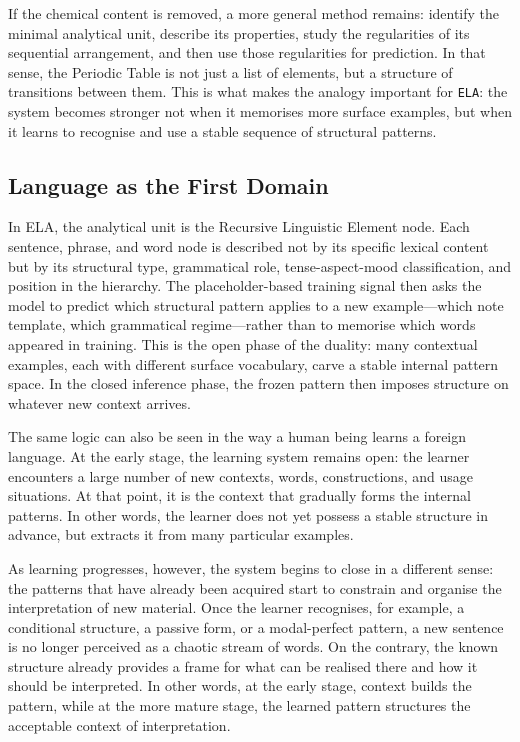 \documentclass[12pt,a4paper,oneside]{report}
\begin{document}
If the chemical content is removed, a more general method remains: identify the minimal analytical unit, describe its properties, study the regularities of its sequential arrangement, and then use those regularities for prediction. In that sense, the Periodic Table is not just a list of elements, but a structure of transitions between them. This is what makes the analogy important for \texttt{ELA}: the system becomes stronger not when it memorises more surface examples, but when it learns to recognise and use a stable sequence of structural patterns.

\subsection*{Language as the First Domain}

In ELA, the analytical unit is the Recursive Linguistic Element node. Each sentence, phrase,
and word node is described not by its specific lexical content but by its structural type,
grammatical role, tense-aspect-mood classification, and position in the hierarchy. The
placeholder-based training signal then asks the model to predict which structural pattern
applies to a new example---which note template, which grammatical regime---rather than
to memorise which words appeared in training. This is the open phase of the duality: many
contextual examples, each with different surface vocabulary, carve a stable internal pattern
space. In the closed inference phase, the frozen pattern then imposes structure on whatever
new context arrives.

The same logic can also be seen in the way a human being learns a foreign language. At the
early stage, the learning system remains open: the learner encounters a large number of
new contexts, words, constructions, and usage situations. At that point, it is the context
that gradually forms the internal patterns. In other words, the learner does not yet possess
a stable structure in advance, but extracts it from many particular examples.

As learning progresses, however, the system begins to close in a different sense: the
patterns that have already been acquired start to constrain and organise the interpretation
of new material. Once the learner recognises, for example, a conditional structure, a
passive form, or a modal-perfect pattern, a new sentence is no longer perceived as a chaotic
stream of words. On the contrary, the known structure already provides a frame for what
can be realised there and how it should be interpreted. In other words, at the early stage,
context builds the pattern, while at the more mature stage, the learned pattern structures
the acceptable context of interpretation.
\end{document}
